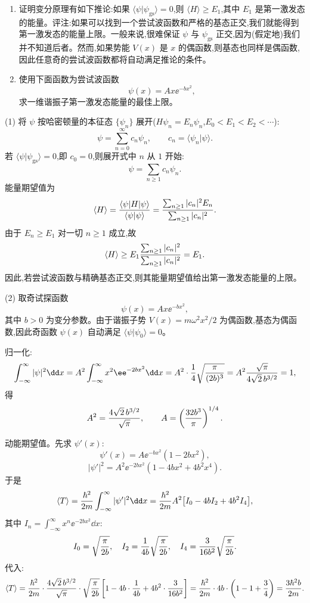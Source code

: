 \begin{question}
\begin{enumerate}
\item 证明变分原理有如下推论:如果 $\langle\psi|\psi_{\mathrm{gs}}\rangle=0$,则 $\langle H\rangle\ge E_1$,其中 $E_1$ 是第一激发态的能量。评注:如果可以找到一个尝试波函数和严格的基态正交,我们就能得到第一激发态的能量上限。一般来说,很难保证 $\psi$ 与 $\psi_{\mathrm{gs}}$ 正交,因为(假定地)我们并不知道后者。然而,如果势能 $V(x)$ 是 $x$ 的偶函数,则基态也同样是偶函数,因此任意奇的尝试波函数都将自动满足推论的条件。
\item 使用下面函数为尝试波函数
\[
\psi(x)=Ax\ee^{-b x^2},
\]
求一维谐振子第一激发态能量的最佳上限。
\end{enumerate}
\end{question}
\begin{solution}
(1) 将 $\psi$ 按哈密顿量的本征态 $\{\psi_n\}$ 展开($H\psi_n=E_n\psi_n$,$E_0<E_1<E_2<\cdots$):
\[
\psi=\sum_{n=0}^\infty c_n\psi_n,\qquad c_n=\langle\psi_n|\psi\rangle.
\]
若 $\langle\psi|\psi_{\mathrm{gs}}\rangle=0$,即 $c_0=0$,则展开式中 $n$ 从 $1$ 开始:
\[
\psi=\sum_{n\ge1}c_n\psi_n.
\]
能量期望值为
\[
\langle H\rangle={\langle\psi|H|\psi\rangle\over\langle\psi|\psi\rangle}
={\sum_{n\ge1}|c_n|^2E_n\over\sum_{n\ge1}|c_n|^2}.
\]
由于 $E_n\ge E_1$ 对一切 $n\ge1$ 成立,故
\[
\langle H\rangle\ge E_1{\sum_{n\ge1}|c_n|^2\over\sum_{n\ge1}|c_n|^2}=E_1.
\]
因此,若尝试波函数与精确基态正交,则其能量期望值给出第一激发态能量的上限。

(2) 取奇试探函数
\[
\psi(x)=Ax\ee^{-bx^2},
\]
其中 $b>0$ 为变分参数。由于谐振子势 $V(x)=m\omega^2x^2/2$ 为偶函数,基态为偶函数,因此奇函数 $\psi(x)$ 自动满足 $\langle\psi|\psi_0\rangle=0$。

归一化:
\[
\int_{-\infty}^\infty|\psi|^2\dd x
=A^2\int_{-\infty}^\infty x^2\ee^{-2bx^2}\dd x
=A^2\cdot{1\over4}\sqrt{\pi\over(2b)^3}
=A^2{\sqrt\pi\over4\sqrt2\,b^{3/2}}=1,
\]
得
\[
A^2={4\sqrt2\,b^{3/2}\over\sqrt\pi},\qquad
A=\left({32b^3\over\pi}\right)^{1/4}.
\]

动能期望值。先求 $\psi'(x)$:
\[
\psi'(x)=A\ee^{-bx^2}(1-2bx^2),
\]
\[
|\psi'|^2=A^2\ee^{-2bx^2}(1-4bx^2+4b^2x^4).
\]
于是
\[
\langle T\rangle={\hbar^2\over2m}\int_{-\infty}^\infty|\psi'|^2\dd x
={\hbar^2\over2m}A^2\bigl[I_0-4bI_2+4b^2I_4\bigr],
\]
其中 $I_n=\int_{-\infty}^\infty x^n \ee^{-2bx^2}\dd x$:
\[
I_0=\sqrt{\pi\over2b},\quad
I_2={1\over4b}\sqrt{\pi\over2b},\quad
I_4={3\over16b^2}\sqrt{\pi\over2b}.
\]
代入:
\[
\langle T\rangle={\hbar^2\over2m}\cdot{4\sqrt2\,b^{3/2}\over\sqrt\pi}
\cdot\sqrt{\pi\over2b}\left[1-4b\cdot{1\over4b}+4b^2\cdot{3\over16b^2}\right]
={\hbar^2\over2m}\cdot4b\cdot\left(1-1+{3\over4}\right)
={3\hbar^2b\over2m}.
\]


\end{solution}
